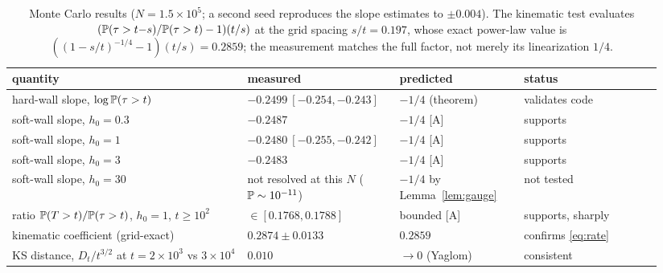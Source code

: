 \begin{table}[h]\centering\footnotesize
\setlength{\tabcolsep}{4pt}
\begin{tabular}{@{}p{0.34\linewidth}p{0.22\linewidth}p{0.18\linewidth}p{0.20\linewidth}@{}}
\toprule
quantity & measured & predicted & status\\
\midrule
hard-wall slope, $\log\mathbb{P}(\tau>t)$ & $-0.2499\ [-0.254,-0.243]$ &
$-1/4$ (theorem) & validates code\\
soft-wall slope, $h_0=0.3$ & $-0.2487$ & $-1/4$ [A] & supports\\
soft-wall slope, $h_0=1$ & $-0.2480\ [-0.255,-0.242]$ & $-1/4$ [A] & supports\\
soft-wall slope, $h_0=3$ & $-0.2483$ & $-1/4$ [A] & supports\\
soft-wall slope, $h_0=30$ & not resolved at this $N$ ($\mathbb{P}\sim10^{-11}$) & $-1/4$ by
Lemma~\ref{lem:gauge} & not tested\\
ratio $\mathbb{P}(T>t)/\mathbb{P}(\tau>t)$, $h_0=1$, $t\ge10^2$ &
$\in[0.1768,0.1788]$ & bounded [A] & supports, sharply\\
kinematic coefficient (grid-exact) & $0.2874\pm0.0133$ & $0.2859$ &
confirms \eqref{eq:rate}\\
KS distance, $D_t/t^{3/2}$ at $t=2\times10^3$ vs $3\times10^4$ &
$0.010$ & $\to0$ (Yaglom) & consistent\\
\bottomrule
\end{tabular}
\caption{\small Monte Carlo results ($N=1.5\times10^5$; a second seed
reproduces the slope estimates to $\pm0.004$). The kinematic test
evaluates $(\mathbb{P}(\tau>t{-}s)/\mathbb{P}(\tau>t)-1)(t/s)$ at the grid spacing
$s/t=0.197$, whose exact power-law value is
$((1{-}s/t)^{-1/4}{-}1)(t/s)=0.2859$; the measurement matches the full
factor, not merely its linearization $1/4$.}
\label{tab:numerics}
\end{table}

